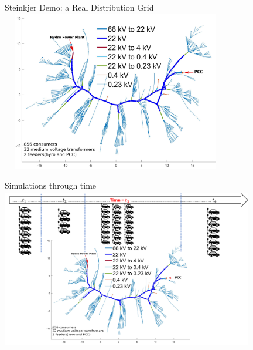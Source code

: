 \documentclass{beamer}
\begin{document}
\begin{frame}{Steinkjer Demo: a Real Distribution Grid}
\includegraphics[width=100mm, height=70mm]{Figures/DistributionGrid26082021.png}


\end{frame}
\begin{frame}{Simulations through time}
\includegraphics[width=110mm, height=70mm]{Figures/CaseStudy/CaseStudy.png}
\end{frame}

\end{document}
